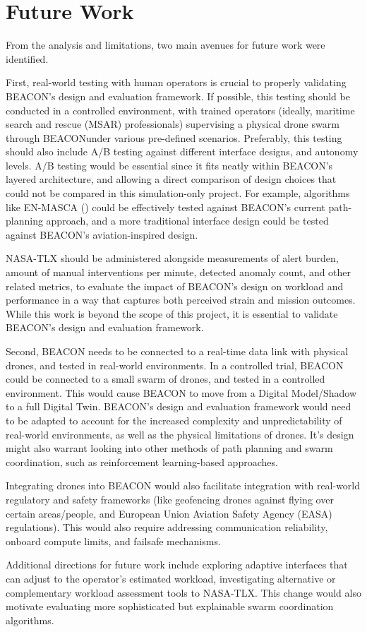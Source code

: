 \section{Future Work}\label{sec:future-work}

From the analysis and limitations, two main avenues for future work were identified.

First, real-world testing with human operators is crucial to properly validating BEACON's design and evaluation framework.
If possible, this testing should be conducted in a controlled environment, with trained operators (ideally, maritime search and rescue (MSAR) professionals) supervising a physical drone swarm through BEACON\@ under various pre-defined scenarios.
Preferably, this testing should also include A/B testing against different interface designs, and autonomy levels.
A/B testing would be essential since it fits neatly within BEACON's layered architecture, and allowing a direct comparison of design choices that could not be compared in this simulation-only project.
For example, algorithms like EN-MASCA (\cite{ENMASCA2025}) could be effectively tested against BEACON's current path-planning approach, and a more traditional interface design could be tested against BEACON's aviation-inspired design.

NASA-TLX should be administered alongside measurements of alert burden, amount of manual interventions per minute, detected anomaly count, and other related metrics, to evaluate the impact of BEACON's design on workload and performance in a way that captures both perceived strain and mission outcomes.
While this work is beyond the scope of this project, it is essential to validate BEACON's design and evaluation framework.

Second, BEACON needs to be connected to a real-time data link with physical drones, and tested in real-world environments.
In a controlled trial, BEACON could be connected to a small swarm of drones, and tested in a controlled environment.
This would cause BEACON to move from a Digital Model/Shadow to a full Digital Twin.
BEACON's design and evaluation framework would need to be adapted to account for the increased complexity and unpredictability of real-world environments, as well as the physical limitations of drones.
It's design might also warrant looking into other methods of path planning and swarm coordination, such as reinforcement learning-based approaches.

Integrating drones into BEACON would also facilitate integration with real-world regulatory and safety frameworks (like geofencing drones against flying over certain areas/people, and European Union Aviation Safety Agency (EASA) regulations).
This would also require addressing communication reliability, onboard compute limits, and failsafe mechanisms.

Additional directions for future work include exploring adaptive interfaces that can adjust to the operator's estimated workload, investigating alternative or complementary workload assessment tools to NASA-TLX\@.
This change would also motivate evaluating more sophisticated but explainable swarm coordination algorithms.
